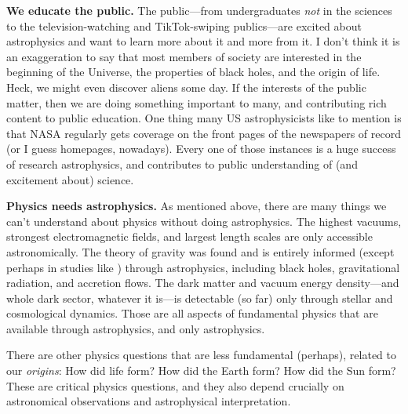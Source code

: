 \documentclass{article}
\newcommand{\paragraphskip}{\medskip}
\renewcommand{\paragraph}[1]{\par\paragraphskip\noindent\textbf{#1}}
\begin{document}
\paragraph{We educate the public.}
The public---from undergraduates \emph{not} in the sciences to the television-watching and TikTok-swiping publics---are excited about astrophysics and want to learn more about it and more from it.
I don't think it is an exaggeration to say that most members of society are interested in the beginning of the Universe, the properties of black holes, and the origin of life.
Heck, we might even discover aliens some day.
If the interests of the public matter, then we are doing something important to many, and contributing rich content to public education.
One thing many US astrophysicists like to mention is that NASA regularly gets coverage on the front pages of the newspapers of record (or I guess homepages, nowadays).
Every one of those instances is a huge success of research astrophysics, and contributes to public understanding of (and excitement about) science.

\paragraph{Physics needs astrophysics.}
As mentioned above, there are many things we can't understand about physics without doing astrophysics.
The highest vacuums, strongest electromagnetic fields, and largest length scales are only accessible astronomically.
The theory of gravity was found and is entirely informed (except perhaps in studies like \cite{adelberger}) through astrophysics, including black holes, gravitational radiation, and accretion flows.
The dark matter and vacuum energy density---and whole dark sector, whatever it is---is detectable (so far) only through stellar and cosmological dynamics.
Those are all aspects of fundamental physics that are available through astrophysics, and only astrophysics.

There are other physics questions that are less fundamental (perhaps), related to our \emph{origins}:
How did life form? How did the Earth form? How did the Sun form?
These are critical physics questions, and they also depend crucially on astronomical observations and astrophysical interpretation.
\end{document}
